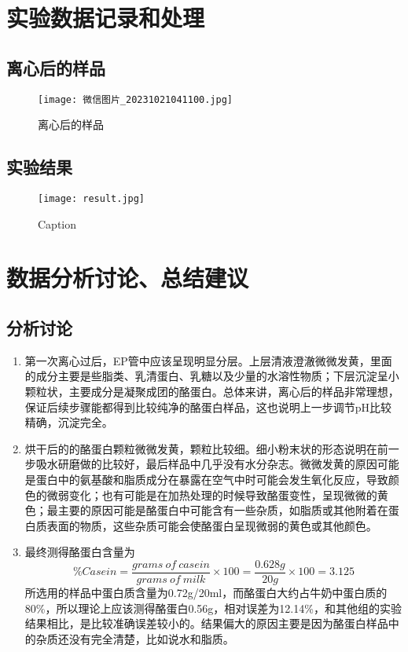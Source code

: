 \documentclass[UTF8]{ctexart}
\begin{document}
\section{实验数据记录和处理}
\subsection{离心后的样品}
\begin{figure}[h]
    \centering
    \texttt{[image: 微信图片\_20231021041100.jpg]}
    \caption{离心后的样品}
    \label{fig:enter-label}
\end{figure}
\subsection{实验结果}
\begin{figure}[h]
    \centering
    \texttt{[image: result.jpg]}
    \caption{Caption}
    \label{fig:enter-label}
\end{figure}

\section{数据分析讨论、总结建议}
\subsection{分析讨论}
\begin{enumerate}
    \item 第一次离心过后，EP管中应该呈现明显分层。上层清液澄澈微微发黄，里面的成分主要是些脂类、乳清蛋白、乳糖以及少量的水溶性物质；下层沉淀呈小颗粒状，主要成分是凝聚成团的酪蛋白。总体来讲，离心后的样品非常理想，保证后续步骤能都得到比较纯净的酪蛋白样品，这也说明上一步调节pH比较精确，沉淀完全。
    \item 烘干后的的酪蛋白颗粒微微发黄，颗粒比较细。细小粉末状的形态说明在前一步吸水研磨做的比较好，最后样品中几乎没有水分杂志。微微发黄的原因可能是蛋白中的氨基酸和脂质成分在暴露在空气中时可能会发生氧化反应，导致颜色的微弱变化；也有可能是在加热处理的时候导致酪蛋变性，呈现微微的黄色；最主要的原因可能是酪蛋白中可能含有一些杂质，如脂质或其他附着在蛋白质表面的物质，这些杂质可能会使酪蛋白呈现微弱的黄色或其他颜色。
    \item 最终测得酪蛋白含量为\[\% Casein =  \frac{grams\ of\ casein}{grams\ of\ milk} \times 100 = \frac{0.628g}{20g} \times 100 = 3.125\]所选用的样品中蛋白质含量为0.72g/20ml，而酪蛋白大约占牛奶中蛋白质的80\%，所以理论上应该测得酪蛋白0.56g，相对误差为12.14\%，和其他组的实验结果相比，是比较准确误差较小的。结果偏大的原因主要是因为酪蛋白样品中的杂质还没有完全清楚，比如说水和脂质。
\end{enumerate}
\end{document}
